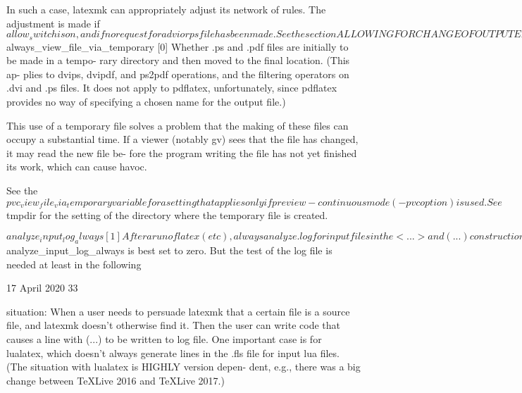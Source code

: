               In such a case, latexmk can appropriately adjust its network  of
              rules.  The adjustment is made if $allow_switch is on, and if no
              request for a dvi or ps file has been made.

              See the section ALLOWING FOR CHANGE OF OUTPUT EXTENSION.


       $always_view_file_via_temporary [0]
              Whether .ps and .pdf files are initially to be made in a  tempo-
              rary  directory and then moved to the final location.  (This ap-
              plies to dvips, dvipdf, and ps2pdf operations, and the filtering
              operators on .dvi and .ps files.  It does not apply to pdflatex,
              unfortunately, since pdflatex provides no way  of  specifying  a
              chosen name for the output file.)

              This use of a temporary file solves a problem that the making of
              these files can occupy a substantial time.  If a viewer (notably
              gv) sees that the file has changed, it may read the new file be-
              fore the program writing the file has not yet finished its work,
              which  can cause havoc.

              See the $pvc_view_file_via_temporary variable for a setting that
              applies only if preview-continuous mode (-pvc option)  is  used.
              See $tmpdir for the setting of the directory where the temporary
              file is created.


       $analyze_input_log_always [1]

              After a run of latex (etc), always analyze .log for input  files
              in  the  <...>  and (...) constructions.  Otherwise, only do the
              analysis when fls file doesn't exist or is out of date.

              Under normal circumstances, the data in the fls  file  is  reli-
              able, and the test of the log file gets lots of false positives;
              usually $analyze_input_log_always is best set to zero.  But  the
              test  of  the  log  file  is  needed  at  least in the following



                                 17 April 2020                              33








              situation: When a user needs to persuade latexmk that a  certain
              file  is  a  source file, and latexmk doesn't otherwise find it.
              Then the user can write code that causes a line with (...) to be
              written  to log file.  One important case is for lualatex, which
              doesn't always generate lines in the .fls  file  for  input  lua
              files.   (The  situation  with lualatex is HIGHLY version depen-
              dent, e.g., there was a big  change  between  TeXLive  2016  and
              TeXLive 2017.)

